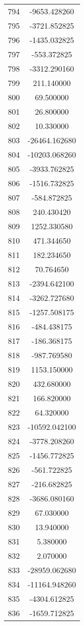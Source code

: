 \documentclass[12pt]{article}
\begin{document}
\begin{longtable}{@{}cc@{}}
794 & -9653.428260 \\
795 & -3721.852825 \\
796 & -1435.032825 \\
797 & -553.372825 \\
798 & -3312.290160 \\
799 & 211.140000 \\
800 & 69.500000 \\
801 & 26.800000 \\
802 & 10.330000 \\
803 & -26464.162680 \\
804 & -10203.068260 \\
805 & -3933.762825 \\
806 & -1516.732825 \\
807 & -584.872825 \\
808 & 240.430420 \\
809 & 1252.330580 \\
810 & 471.344650 \\
811 & 182.234650 \\
812 & 70.764650 \\
813 & -2394.642100 \\
814 & -3262.727680 \\
815 & -1257.508175 \\
816 & -484.438175 \\
817 & -186.368175 \\
818 & -987.769580 \\
819 & 1153.150000 \\
820 & 432.680000 \\
821 & 166.820000 \\
822 & 64.320000 \\
823 & -10592.042100 \\
824 & -3778.208260 \\
825 & -1456.772825 \\
826 & -561.722825 \\
827 & -216.682825 \\
828 & -3686.080160 \\
829 & 67.030000 \\
830 & 13.940000 \\
831 & 5.380000 \\
832 & 2.070000 \\
833 & -28959.062680 \\
834 & -11164.948260 \\
835 & -4304.612825 \\
836 & -1659.712825 \\

\end{longtable}
\end{document}
